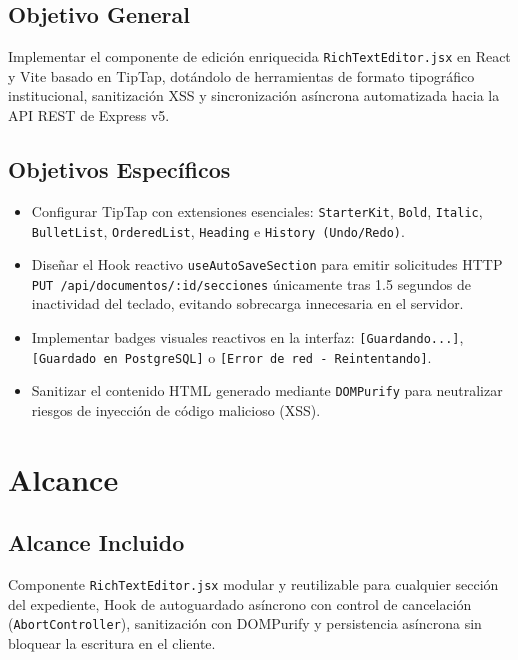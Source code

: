 \documentclass[12pt,a4paper]{article}
\begin{document}
\subsection{Objetivo General}
Implementar el componente de edición enriquecida \texttt{RichTextEditor.jsx} en React y Vite basado en TipTap, dotándolo de herramientas de formato tipográfico institucional, sanitización XSS y sincronización asíncrona automatizada hacia la API REST de Express v5.

\subsection{Objetivos Específicos}
\begin{itemize}[leftmargin=1.5em, itemsep=1.5pt, topsep=1.5pt]
    \item Configurar TipTap con extensiones esenciales: \texttt{StarterKit}, \texttt{Bold}, \texttt{Italic}, \texttt{BulletList}, \texttt{OrderedList}, \texttt{Heading} e \texttt{History (Undo/Redo)}.
    \item Diseñar el Hook reactivo \texttt{useAutoSaveSection} para emitir solicitudes HTTP \texttt{PUT /api/documentos/:id/secciones} únicamente tras 1.5 segundos de inactividad del teclado, evitando sobrecarga innecesaria en el servidor.
    \item Implementar badges visuales reactivos en la interfaz: \texttt{[Guardando...]}, \texttt{[Guardado en PostgreSQL]} o \texttt{[Error de red - Reintentando]}.
    \item Sanitizar el contenido HTML generado mediante \texttt{DOMPurify} para neutralizar riesgos de inyección de código malicioso (XSS).
\end{itemize}

\section{Alcance}

\subsection{Alcance Incluido}
Componente \texttt{RichTextEditor.jsx} modular y reutilizable para cualquier sección del expediente, Hook de autoguardado asíncrono con control de cancelación (\texttt{AbortController}), sanitización con DOMPurify y persistencia asíncrona sin bloquear la escritura en el cliente.
\end{document}
